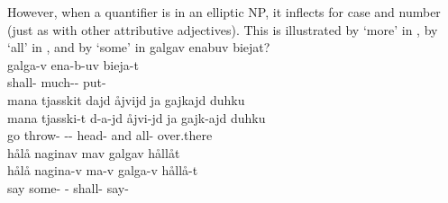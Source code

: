 However, when a quantifier is in an elliptic NP, %
it inflects for case and number (just as with other attributive adjectives). This is illustrated by  ‘more’ in , %
by  ‘all’ in , %
and by  ‘some’ in 
\ea\label{quantifierEx6}
\glll	galgav enabuv biejat?\\
	galga-v ena-b-uv bieja-t\\
	shall- much-- put-\\\nopagebreak
{}	
\z
\ea\label{quantifierEx7}
\glll	mana tjasskit dajd åjvijd ja gajkajd duhku\\
	mana tjasski-t d-a-jd åjvi-jd ja gajk-ajd duhku\\
	go\BS{} throw- -- head- and all- over.there\\\nopagebreak
{}	
\z
\ea\label{quantifierEx8}
\glll	hålå naginav mav galgav hållåt\\
	hålå nagina-v ma-v galga-v hållå-t\\
	say\BS{} some- - shall- say-\\\nopagebreak
{}	
\z

